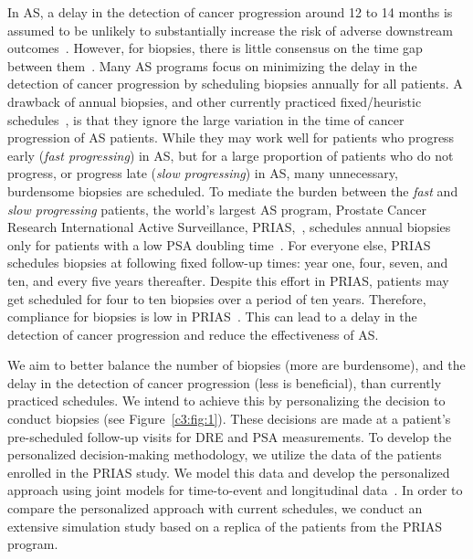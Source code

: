 In AS, a delay in the detection of cancer progression around 12 to 14 months is assumed to be unlikely to substantially increase the risk of adverse downstream outcomes~\citep{inoue2018comparative,carvalho}. However, for biopsies, there is little consensus on the time gap between them~\citep{loeb2014heterogeneity,bruinsma2016active,nieboer2018active}. Many AS programs focus on minimizing the delay in the detection of cancer progression by scheduling biopsies annually for all patients. A drawback of annual biopsies, and other currently practiced fixed/heuristic schedules~\citep{loeb2014heterogeneity,bruinsma2016active,nieboer2018active}, is that they ignore the large variation in the time of cancer progression of AS patients. While they may work well for patients who progress early (\emph{fast progressing}) in AS, but for a large proportion of patients who do not progress, or progress late (\emph{slow progressing}) in AS, many unnecessary, burdensome biopsies are scheduled. To mediate the burden between the \emph{fast} and \emph{slow progressing} patients, the world's largest AS program, Prostate Cancer Research International Active Surveillance, PRIAS,~\citep{bokhorst2016decade}, schedules annual biopsies only for patients with a low PSA doubling time~\citep{bokhorst2015compliance}. For everyone else, PRIAS schedules biopsies at following fixed follow-up times: year one, four, seven, and ten, and every five years thereafter. Despite this effort in PRIAS, patients may get scheduled for four to ten biopsies over a period of ten years. Therefore, compliance for biopsies is low in PRIAS~\citep{bokhorst2015compliance}. This can lead to a delay in the detection of cancer progression and reduce the effectiveness of AS.

We aim to better balance the number of biopsies (more are burdensome), and the delay in the detection of cancer progression (less is beneficial), than currently practiced schedules. We intend to achieve this by personalizing the decision to conduct biopsies (see Figure~\ref{c3:fig:1}). These decisions are made at a patient's pre-scheduled follow-up visits for DRE and PSA measurements. To develop the personalized decision-making methodology, we utilize the data of the patients enrolled in the PRIAS study. We model this data and develop the personalized approach using joint models for time-to-event and longitudinal data~\citep{tsiatis2004joint,rizopoulos2012joint}. In order to compare the personalized approach with current schedules, we conduct an extensive simulation study based on a replica of the patients from the PRIAS program. 

